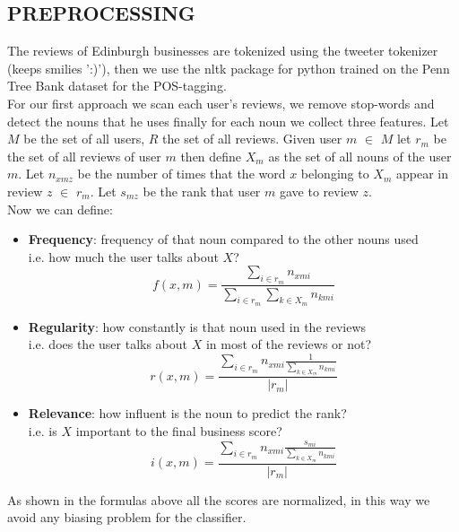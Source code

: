 \documentclass[11pt]{article}
\begin{document}
\subsection{PREPROCESSING}
The reviews of Edinburgh businesses are tokenized using the tweeter tokenizer (keeps smilies ':)'), then we use the nltk package for python trained on the  Penn Tree Bank dataset for the POS-tagging.\\
For our first approach we scan each user's reviews, we remove stop-words and detect the nouns that he uses finally for each noun we collect three features.
Let $M$ be the set of all users, $R$ the set of all reviews.
Given user $m$ $\in$ $M$ let $r_m$ be the set of all reviews of user $m$ then define $X_m$ as the set of all nouns of the user $m$.
Let $n_{xmz}$ be the number of times that the word $x$ belonging to $X_m$ appear in review $z$ $\in$ $r_m.$
Let $s_{mz}$ be the rank that user $m$ gave to review $z$.\\
Now we can define:
\begin{itemize}
	\item \textbf{Frequency}: frequency of that noun compared to the other nouns used\\
	i.e. how much the user talks about $X$?
	\[ f(x,m)= \frac{\sum_{i \in r_m}n_{xmi}}{\sum_{i \in r_m}\sum_{k \in X_m} n_{kmi}} \]
	\item \textbf{Regularity}: how constantly is that noun used in the reviews\\
	i.e. does the user talks about $X$ in most of the reviews or not?
	\[ r(x,m)= \frac{\sum_{i \in r_m}
		n_{xmi}  \frac{1}{\sum_{k \in X_m}n_{kmi}}}	
	{|r_m|} \]
	\item \textbf{Relevance}: how influent is the noun to predict the rank?\\
	i.e. is $X$ important to the final business score?
	\[ i(x,m)= \frac{\sum_{i \in r_m}
		n_{xmi}  \frac{s_{mi}}{\sum_{k \in X_m}n_{kmi}}}	
	{|r_m|} \]
\end{itemize}
As shown in the formulas above all the scores are normalized, in this way we avoid any biasing problem for the classifier.\\
\end{document}
